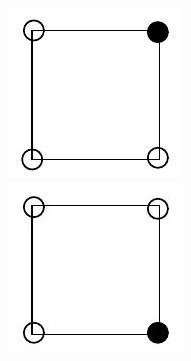\documentclass[10pt]{article}
\begin{document}
\includegraphics[max width=\textwidth, center]{2025_09_05_3ba26226ec0baddb5a03g-56}\\
\includegraphics[max width=\textwidth, center]{2025_09_05_3ba26226ec0baddb5a03g-56(6)}\\
\end{document}
